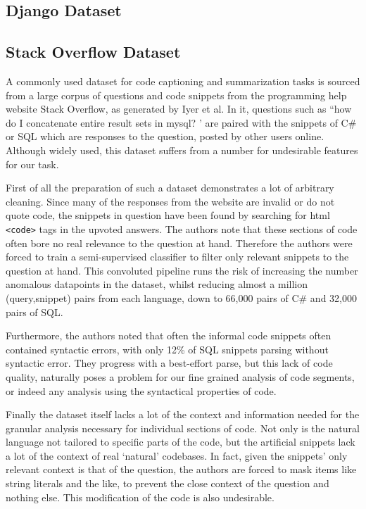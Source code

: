 \subsection{Django Dataset}



\subsection{Stack Overflow Dataset}

A commonly used dataset for code captioning and summarization tasks is sourced from a large corpus of questions and code snippets from the programming help website Stack Overflow, as generated by Iyer et al\cite{iyer_summarizing_2016}. In it, questions such as ``how do I concatenate entire result sets in mysql? ' are paired with the snippets of C\# or SQL which are responses to the question, posted by other users online.
Although widely used, this dataset suffers from a number for undesirable features for our task. 

First of all the preparation of such a dataset demonstrates a lot of arbitrary cleaning.
Since many of the responses from the website are invalid or do not quote code, the snippets in question have been found by searching for html \texttt{<code>} tags in the upvoted answers. 
The authors note that these sections of code often bore no real relevance to the question at hand. Therefore the authors were forced to train a semi-supervised classifier to filter only relevant snippets to the question at hand.
This convoluted pipeline runs the risk of increasing the number anomalous datapoints in the dataset, whilst reducing almost a million (query,snippet) pairs from each language, down to 66,000 pairs  of C\# and 32,000 pairs of SQL.

Furthermore, the authors noted that often the informal code snippets often contained syntactic errors, with only 12\% of SQL snippets parsing without syntactic error. They progress with a best-effort parse, but this
 lack of code quality, naturally poses a problem for our fine grained analysis of code segments, or indeed any analysis using the syntactical properties of code.

Finally the dataset itself lacks a lot of the context and information needed for the granular analysis necessary for individual sections of code. Not only is the natural language not tailored to specific parts of the code, but the artificial snippets lack a lot of the context of real `natural' codebases. In fact, given the snippets' only relevant context is that of the question, the authors are forced to mask items like string literals and the like, to prevent the close context of the question and nothing else. This modification of the code is also undesirable.

